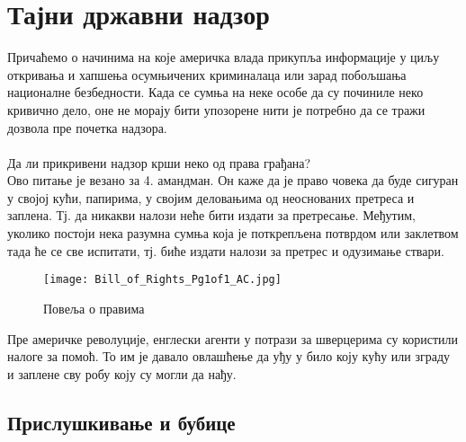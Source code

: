 \documentclass{article}
\begin{document}
\newpage
\section{Тајни државни надзор}
Причаћемо о начинима на које америчка влада прикупља информације у циљу откривања и хапшења осумњичених криминалаца или зарад побољшања националне безбедности. Када се сумња на неке особе да су починиле неко кривично дело, оне не морају бити упозорене нити је потребно да се тражи дозвола пре почетка надзора.
\\\\
Да ли прикривени надзор крши неко од права грађана? \\
Ово питање је везано за 4. амандман. Он каже да је право човека да буде сигуран у својој кући, папирима, у својим деловањима од неоснованих претреса и заплена. Тј. да никакви налози неће бити издати за претресање. Међутим, уколико постоји нека разумна сумња која је поткрепљена потврдом или заклетвом тада ће се све испитати, тј. биће издати налози за претрес и одузимање ствари.
\begin{figure}[h!]
\centering
\texttt{[image: Bill\_of\_Rights\_Pg1of1\_AC.jpg]}
\caption{\label{fig:sangaj}Повеља о правима}
\end{figure} 

Пре америчке револуције, енглески агенти у потрази за шверцерима су користили налоге за помоћ. То им је давало овлашћење да уђу у било коју кућу или зграду и заплене сву робу коју су могли да нађу. \\

\subsection{Прислушкивање и бубице}
\end{document}

